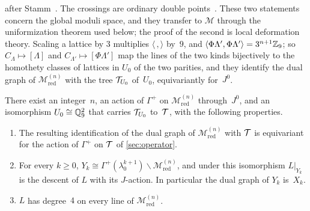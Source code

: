after Stamm~\cite{Stamm1997}. The crossings are ordinary double points~\cite[Theorem~6.1]{BachmatGoren1999}. These two
statements concern the global moduli space, and they transfer to $\mathcal M$ through the uniformization theorem used below;
the proof of the second is local deformation theory. Scaling a lattice by $3$
multiplies $\langle\,,\rangle$ by~$9$, and $\langle\Phi\Lambda',\Phi\Lambda'\rangle=3^{n+1}\mathbb{Z}_9$; so $C_\Lambda\mapsto[\Lambda]$
and $C_{\Lambda'}\mapsto[\Phi\Lambda']$ map the lines of the two kinds bijectively to the homothety classes of lattices in
$U_0$ of the two parities, and they identify the dual graph of $\mathcal M^{(n)}_{\mathrm{red}}$ with the tree
$\mathcal{T}_{U_0}$ of~$U_0$, equivariantly for~$J^0$.

\begin{lemma}[Uniformization]\label{lem:uniformization}
\notformalized
There exist an integer~$n$, an action of $\Gamma^+$ on $\mathcal M^{(n)}_{\mathrm{red}}$ through~$J^0$, and an isomorphism
$U_0\cong\mathbb{Q}_9^2$ that carries $\mathcal{T}_{U_0}$ to~$\mathcal{T}$, with the following properties.
\begin{enumerate}[label=(\alph*)]
\item The resulting identification of the dual graph of $\mathcal M^{(n)}_{\mathrm{red}}$ with $\mathcal{T}$ is equivariant for
the action of $\Gamma^+$ on $\mathcal{T}$ of \cref{sec:operator}.
\item For every $k\ge0$, $Y_k\cong\Gamma^+(\lambda_0^{k+1})\backslash\mathcal M^{(n)}_{\mathrm{red}}$, and under this
isomorphism $L|_{Y_k}$ is the descent of $L$ with its $J$-action. In particular the dual graph of $Y_k$ is~$X_k$.
\item $L$ has degree~$4$ on every line of $\mathcal M^{(n)}_{\mathrm{red}}$.
\end{enumerate}
\end{lemma}
